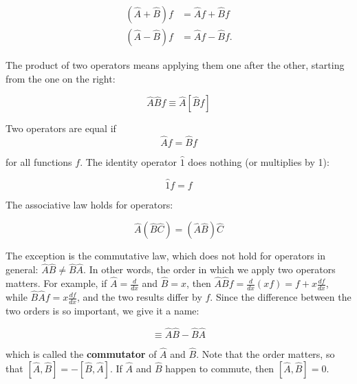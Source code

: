 \documentclass[
  english,
  9pt,
]{extbook}
\theoremstyle{definition}
\theoremstyle{definition}
\theoremstyle{definition}
\theoremstyle{definition}
\theoremstyle{remark}
\begin{document}
\begin{equation}
\begin{aligned}
 (\hat{A} + \hat{B}) f &= \hat{A} f + \hat{B} f \\
(\hat{A} - \hat{B}) f &= \hat{A} f - \hat{B} f.
\end{aligned}
\label{eq:bp0}
\end{equation}

The product of two operators means applying them one after the other, starting from the one on the right:

\begin{equation}
\hat{A} \hat{B} f \equiv \hat{A} [ \hat{B} f ]
\label{eq:bp1}
\end{equation}

Two operators are equal if
\begin{equation}
\hat{A} f = \hat{B} f
\label{eq:bp2}
\end{equation}

for all functions \(f\). The identity operator \(\hat{1}\) does nothing (or multiplies by 1):

\begin{equation}
{\hat 1} f = f
\label{eq:bp3}
\end{equation}

The associative law holds for operators:

\begin{equation}
\hat{A}(\hat{B}\hat{C}) = (\hat{A}\hat{B})\hat{C}
\label{eq:bp4}
\end{equation}

The exception is the commutative law, which does not hold for operators in general: \(\hat{A} \hat{B} \neq \hat{B} \hat{A}\). In other words, the order in which we apply two operators matters. For example, if \(\hat{A}=\frac{d}{dx}\) and \(\hat{B}=x\), then \(\hat{A}\hat{B}f=\frac{d}{dx}(xf)=f+x\frac{df}{dx}\), while \(\hat{B}\hat{A}f=x\frac{df}{dx}\), and the two results differ by \(f\). Since the difference between the two orders is so important, we give it a name:

\begin{equation}
[\hat{A}, \hat{B}]\equiv \hat{A} \hat{B} - \hat{B} \hat{A}
\label{eq:bp5}
\end{equation}

which is called the \textbf{commutator} of \(\hat{A}\) and \(\hat{B}\). Note that the order matters, so that \([ \hat{A}, \hat{B}] = - [ \hat{B}, \hat{A}]\). If \(\hat{A}\) and \(\hat{B}\) happen to commute, then \([\hat{A}, \hat{B}] = 0\).
\end{document}
